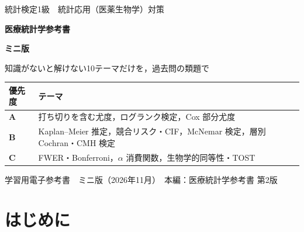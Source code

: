 \documentclass[a4paper,11pt,openany]{ltjsbook}
\begin{document}
\begin{titlepage}
\vspace*{8mm}
\begin{center}
{\color{white}\large 統計検定1級　統計応用（医薬生物学）対策\par}
\vspace{10mm}
{\color{white}\fontsize{30}{40}\selectfont\bfseries 医療統計学参考書\par}
\vspace{4mm}
{\color{white}\fontsize{20}{28}\selectfont\bfseries ミニ版\par}
\vspace{4mm}
{\color{white}\large 知識がないと解けない10テーマだけを，過去問の類題で\par}
\end{center}
\vspace{36mm}
\begin{center}\small
\begin{tabular}{@{}lL{110mm}@{}}
\toprule
優先度 & テーマ\\
\midrule
\textbf{A} & 打ち切りを含む尤度，ログランク検定，Cox 部分尤度\\
\textbf{B} & Kaplan--Meier 推定，競合リスク・CIF，McNemar 検定，層別 Cochran・CMH 検定\\
\textbf{C} & FWER・Bonferroni，$\alpha$ 消費関数，生物学的同等性・TOST\\
\bottomrule
\end{tabular}
\end{center}
\vfill
\begin{center}
{\small 学習用電子参考書　ミニ版（2026年11月）　本編：医療統計学参考書 第2版}
\end{center}
\end{titlepage}

\frontmatter
{}

\chapter*{はじめに}
\end{document}
